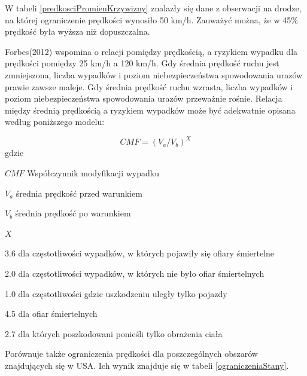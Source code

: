 W tabeli \ref{predkosciPromienKrzywizny} znalazły się dane z obserwacji na drodze, na której ograniczenie prędkości wynosiło 50 km/h. Zauważyć można, że w 45\% prędkość była wyższa niż  dopuszczalna.

Forbes(2012) wspomina o relacji pomiędzy prędkością, a ryzykiem wypadku dla prędkości pomiędzy 25 km/h a 120 km/h. Gdy średnia prędkość ruchu jest zmniejszona, liczba wypadków i  poziom niebezpieczeństwa spowodowania urazów prawie zawsze maleje. Gdy średnia prędkość ruchu wzrasta, liczba wypadków i poziom niebezpieczeństwa spowodowania urazów przeważnie rośnie. Relacja między średnią prędkością a ryzykiem wypadków może być adekwatnie opisana według poniższego modelu:

\begin{equation}
CMF = (V_a / V_b)^X
\end{equation}
gdzie
\begin{eqwhere}[2cm]
	\item[$CMF$] Współczynnik modyfikacji wypadku
	\item[$V_a$] średnia prędkość przed warunkiem
	\item[$V_b$] średnia prędkość po warunkiem
	\item[$X$] \begin{itemize}
		3.6 dla częstotliwości wypadków, w których pojawiły się ofiary śmiertelne

		2.0 dla częstotliwości wypadków, w których nie było ofiar śmiertelnych

		1.0 dla częstotliwości gdzie uszkodzeniu uległy tylko pojazdy

		4.5 dla ofiar śmiertelnych

		2.7 dla których poszkodowani ponieśli tylko obrażenia ciała
	\end{itemize}

\end{eqwhere}
Porównuje także ograniczenia prędkości dla poszczególnych obszarów znajdujących się w USA. Ich wynik znajduje się w tabeli \ref{ograniczeniaStany}.

